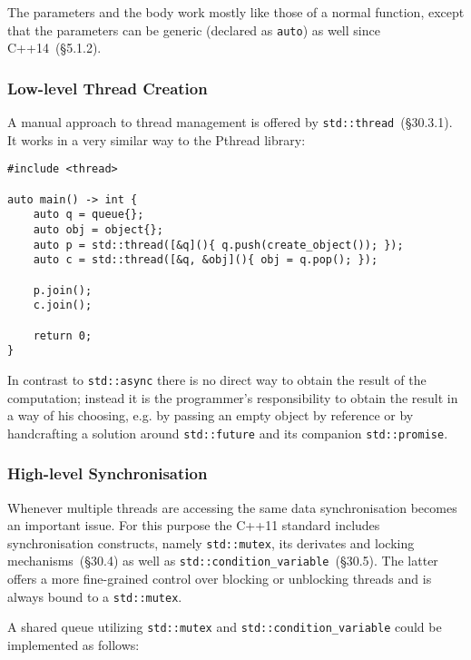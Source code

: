 The parameters and the body work mostly like those of a normal function, except that the parameters can be generic (declared as \texttt{auto}) as well since C++14~\cite{cpp14std}(§5.1.2).

\subsubsection{Low-level Thread Creation}\label{modern:queue:threads}

A manual approach to thread management is offered by \texttt{std::thread}~\cite{cpp11std}(§30.3.1). It works in a very similar way to the Pthread library:

\begin{verbatim}
#include <thread>

auto main() -> int {
    auto q = queue{};
    auto obj = object{};
    auto p = std::thread([&q](){ q.push(create_object()); });
    auto c = std::thread([&q, &obj](){ obj = q.pop(); });
    
    p.join();
    c.join();
    
    return 0;
}
\end{verbatim}

\noindent In contrast to \texttt{std::async} there is no direct way to obtain the result of the computation; instead it is the programmer's responsibility to obtain the result in a way of his choosing, e.g. by passing an empty object by reference or by handcrafting a solution around \texttt{std::future} and its companion \texttt{std::promise}.

\subsubsection{High-level Synchronisation}\label{modern:queue:mutex}

Whenever multiple threads are accessing the same data synchronisation becomes an important issue. For this purpose the C++11 standard includes synchronisation constructs, namely \texttt{std::mutex}, its derivates and locking mechanisms~\cite{cpp11std}(§30.4) as well as \texttt{std::condition\_variable}~\cite{cpp11std}(§30.5). The latter offers a more fine-grained control over blocking or unblocking threads and is always bound to a \texttt{std::mutex}.

A shared queue utilizing \texttt{std::mutex} and \texttt{std::condition\_variable} could be implemented as follows:

